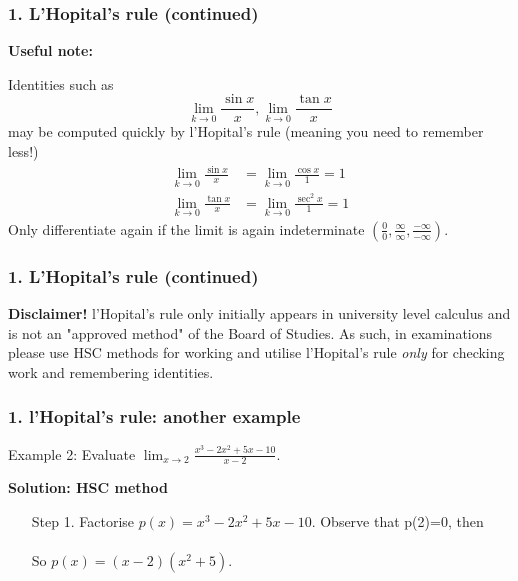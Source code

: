 \documentclass{beamer}
\begin{document}
\begin{frame}
\frametitle{1. L'Hopital's rule (continued)}

{\bf Useful note:}
			
			Identities such as 
\[
\lim_{k\rightarrow 0} \frac{\sin x}{x}, \lim_{k\rightarrow 0} \frac{\tan x}{x} 
\]
may be computed quickly by l'Hopital's rule (meaning you need to remember less!)
\begin{align*}
\lim_{k\rightarrow 0} \frac{\sin x}{x} &= \lim_{k\rightarrow 0} \frac{\cos x}{1} = 1\\[2mm]
\lim_{k\rightarrow 0} \frac{\tan x}{x} &= \lim_{k\rightarrow 0} \frac{\sec ^2 x}{1} = 1
\end{align*}
 Only differentiate again if the limit is again indeterminate $(\frac{0}{0}, \frac{\infty}{\infty}, \frac{-\infty}{-\infty})$.
\end{frame}



\begin{frame}
\frametitle{1. L'Hopital's rule (continued)}

 {\bf Disclaimer! } l'Hopital's rule only initially appears in university level calculus and is not an "approved method" of the Board of Studies. As such, in examinations please use HSC methods for working and utilise l'Hopital's rule {\it only} for checking work and remembering identities.

\end{frame}


\begin{frame}
\frametitle{1. l'Hopital's rule: another example}
			
			\begin{block}{Example 2:}
			Evaluate $\displaystyle{ \lim_{x\rightarrow 2} \frac{ x^3 - 2x^2 + 5x - 10 }{ x-2 } }$.
			\end{block}

 {\bf Solution: HSC method}

 \begin{enumerate}

 \item[Step 1. ] Factorise $p(x) = x^3 - 2x^2 + 5x - 10$. Observe that p(2)=0, then \\
\\
So $p(x)= (x-2)(x^2 + 5)$.

 \end{enumerate}

\end{frame}
\end{document}

